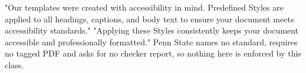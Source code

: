 

%
	{"Our templates were created with accessibility in mind. Predefined Styles
	 are applied to all headings, captions, and body text to ensure your
	 document meets accessibility standards." "Applying these Styles
	 consistently keeps your document accessible and professionally formatted."
	 Penn State names no standard, requires no tagged PDF and asks for no
	 checker report, so nothing here is enforced by this class.}

%
\newcommand{\thesis@copyrightyear}{}
\newcommand{\thesiscopyrightyear}[1]{\renewcommand{\thesis@copyrightyear}{#1}}

